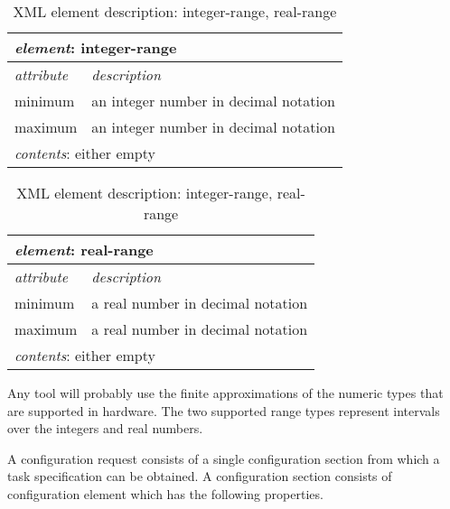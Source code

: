 \documentclass{article}
\begin{document}
   \begin{table}[H]
    \begin{center}
    \begin{tabular}{|l|l|}
      \hline
       \multicolumn{2}{|l|}{\textit{element}: integer-range} \\
      \hline
        \textit{attribute} & \textit{description} \\
      \hline
        minimum & an integer number in decimal notation \\
        maximum & an integer number in decimal notation \\
      \hline
       \multicolumn{2}{|l|}{\textit{contents}: either empty} \\
      \hline
    \end{tabular}
    \begin{tabular}{|l|l|}
      \hline
       \multicolumn{2}{|l|}{\textit{element}: real-range} \\
      \hline
        \textit{attribute} & \textit{description} \\
      \hline
        minimum & a real number in decimal notation \\
        maximum & a real number in decimal notation \\
      \hline
       \multicolumn{2}{|l|}{\textit{contents}: either empty} \\
      \hline
    \end{tabular}
    \end{center}
    \vspace{-0.5cm}
    \caption{XML element description: integer-range, real-range}
   \end{table}

   \noindent Any tool will probably use the finite approximations of the numeric types
   that are supported in hardware. The two supported range types represent
   intervals over the integers and real numbers.

   \noindent A configuration request consists of a single configuration section
   from which a task specification can be obtained. A configuration section
   consists of configuration element which has the following properties.
\end{document}
